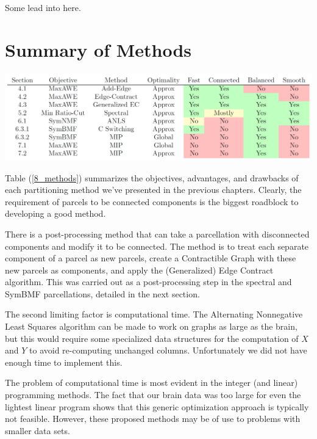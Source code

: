 {\color{red}Some lead into here.}

\section{Summary of Methods}

\begin{table}
\caption{Summary of Partitioning Methods}
\label{8_methods}
\includegraphics[scale = 0.5]{figs/8_methods.png}
%
\end{table}

Table (\ref{8_methods}) summarizes the objectives, advantages, and
drawbacks of each partitioning method we've presented in the previous
chapters. Clearly, the requirement of parcels to be connected components
is the biggest roadblock to developing a good method.

There is a post-processing method that can take a parcellation with
disconnected components and modify it to be connected. The method is to
treat each separate component of a parcel as new parcels, create a
Contractible Graph with these new parcels as components, and apply the
(Generalized) Edge Contract algorithm. This was carried out as a
post-processing step in the spectral and SymBMF parcellations, detailed
in the next section.

The second limiting factor is computational time. The Alternating
Nonnegative Least Squares algorithm can be made to work on graphs as
large as the brain, but this would require some specialized data
structures for the computation of $X$ and $Y$ to avoid re-computing
unchanged columns. Unfortunately we did not have enough time to
implement this.

The problem of computational time is most evident in the integer (and
linear) programming methods. The fact that our brain data was too large
for even the lightest linear program shows that this generic
optimization approach is typically not feasible. However, these
proposed methods may be of use to problems with smaller data sets.

